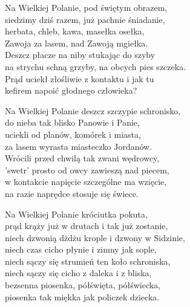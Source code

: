 \begin{text}
    Na Wielkiej Polanie, pod świętym obrazem,\\
    siedzimy dziś razem, już pachnie śniadanie,\\
    herbata, chleb, kawa, masełka osełka,\\
    Zawoja za lasem, nad Zawoją mgiełka.\\
    Deszcz płacze na niby stukając do szyby\\
    na strychu schną grzyby, na obcych pies szczeka.\\
    Prąd uciekł złośliwie z kontaktu i jak tu\\
    kefirem napoić głodnego człowieka?

    Na Wielkiej Polanie deszcz szczypie schronisko,\\
    do nieba tak blisko Panowie i Panie,\\
    uciekli od planów, komórek i miasta,\\
    za lasem wyrasta miasteczko Jordanów.\\
    Wrócili przed chwilą tak zwani wędrowcy,\\
    'swetr' prosto od owcy zawieszą nad piecem,\\
    w kontakcie napięcie szczególne ma wzięcie,\\
    na razie naprędce stosuje się świece.

    Na Wielkiej Polanie króciutka pokuta,\\
    prąd krąży już w drutach i tak już zostanie,\\
    niech dzwonią dżdżu krople i dzwony w Sidzinie,\\
    niech czas cicho płynie i zimny jak sople,\\
    niech sączy się strumień ten koło schroniska,\\
    niech sączy się cicho z daleka i z bliska,\\
    bezsenna piosenka, półświęta, półświecka,\\
    piosenka tak miękka jak policzek dziecka.
\end{text}
\begin{chord}

\end{chord}